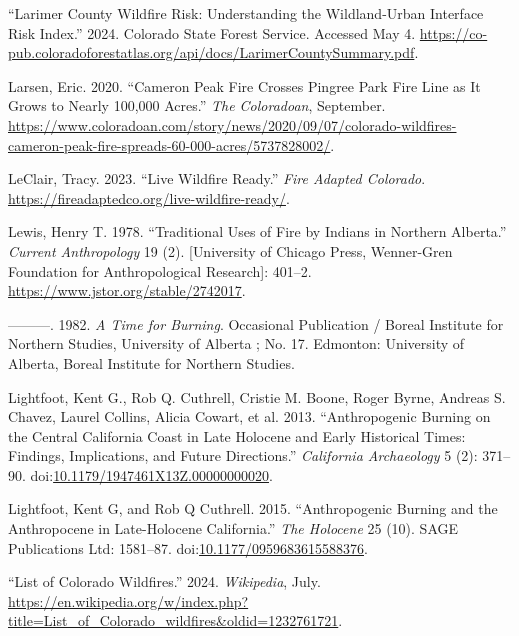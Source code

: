 \documentclass[
]{article}
\newlength{\cslhangindent}
\newenvironment{CSLReferences}[2] %
 {\begin{list}{}{%
  \setlength{\itemindent}{0pt}
  \setlength{\leftmargin}{0pt}
  \setlength{\parsep}{0pt}
  \ifodd #1
   \setlength{\leftmargin}{\cslhangindent}
   \setlength{\itemindent}{-1\cslhangindent}
  \fi
  \setlength{\itemsep}{#2\baselineskip}}}
 {\end{list}}
\begin{document}
\begin{CSLReferences}{1}{0}
{``Larimer {County Wildfire Risk}: {Understanding} the Wildland-Urban Interface Risk Index.''} 2024. Colorado State Forest Service. Accessed May 4. \url{https://co-pub.coloradoforestatlas.org/api/docs/LarimerCountySummary.pdf}.

Larsen, Eric. 2020. {``Cameron {Peak Fire} Crosses {Pingree Park} Fire Line as It Grows to Nearly 100,000 Acres.''} \emph{The Coloradoan}, September. \url{https://www.coloradoan.com/story/news/2020/09/07/colorado-wildfires-cameron-peak-fire-spreads-60-000-acres/5737828002/}.

LeClair, Tracy. 2023. {``Live {Wildfire Ready}.''} \emph{Fire Adapted Colorado}. \url{https://fireadaptedco.org/live-wildfire-ready/}.

Lewis, Henry T. 1978. {``Traditional {Uses} of {Fire} by {Indians} in {Northern Alberta}.''} \emph{Current Anthropology} 19 (2). {[}University of Chicago Press, Wenner-Gren Foundation for Anthropological Research{]}: 401--2. \url{https://www.jstor.org/stable/2742017}.

---------. 1982. \emph{A {Time} for Burning}. Occasional Publication / {Boreal Institute} for {Northern Studies}, {University} of {Alberta} ; No. 17. Edmonton: University of Alberta, Boreal Institute for Northern Studies.

Lightfoot, Kent G., Rob Q. Cuthrell, Cristie M. Boone, Roger Byrne, Andreas S. Chavez, Laurel Collins, Alicia Cowart, et al. 2013. {``Anthropogenic {Burning} on the {Central California Coast} in {Late Holocene} and {Early Historical Times}: {Findings}, {Implications}, and {Future Directions}.''} \emph{California Archaeology} 5 (2): 371--90. doi:\href{https://doi.org/10.1179/1947461X13Z.00000000020}{10.1179/1947461X13Z.00000000020}.

Lightfoot, Kent G, and Rob Q Cuthrell. 2015. {``Anthropogenic Burning and the {Anthropocene} in Late-{Holocene California}.''} \emph{The Holocene} 25 (10). SAGE Publications Ltd: 1581--87. doi:\href{https://doi.org/10.1177/0959683615588376}{10.1177/0959683615588376}.

{``List of {Colorado} Wildfires.''} 2024. \emph{Wikipedia}, July. \url{https://en.wikipedia.org/w/index.php?title=List_of_Colorado_wildfires&oldid=1232761721}.


\end{CSLReferences}
\end{document}
